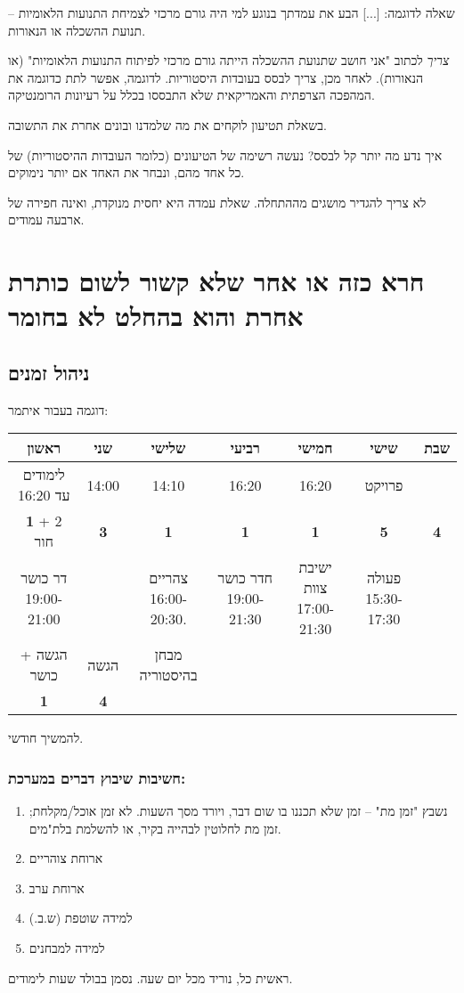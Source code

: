 \documentclass[a4paper]{book}
\begin{document}
	שאלה לדוגמה: [...] הבע את עמדתך בנוגע למי היה גורם מרכזי לצמיחת התנועות הלאומיות – תנועת ההשכלה או הנאורות. 
	
	\textit{צריך} לכתוב "אני חושב שתנועת ההשכלה הייתה גורם מרכזי לפיתוח התנועות הלאומיות" (או הנאורות). לאחר מכן, צריך לבסס בעובדות היסטוריות. לדוגמה, אפשר לתת כדוגמה את המהפכה הצרפתית והאמריקאית שלא התבססו בכלל על רעיונות הרומנטיקה. 
	
	בשאלת תטיעון לוקחים את מה שלמדנו ובונים אחרת את התשובה. 
	
	איך נדע מה יותר קל לבסס? נעשה רשימה של הטיעונים (כלומר העובדות ההיסטוריות) של כל אחד מהם, ונבחר את האחד אם יותר נימוקים. 
	
	לא צריך להגדיר מושגים מההתחלה. שאלת עמדה היא יחסית מנוקדת, ואינה חפירה של ארבעה עמודים. 
	
	\section{חרא כזה או אחר שלא קשור לשום כותרת אחרת והוא בהחלט לא בחומר}
	
	\subsection{ניהול זמנים}
	
	דוגמה בעבור איתמר: 
	\begin{center}
		\begin{tabular}{|c|c|c|c|c|c|c|}
			\hline ראשון & שני & שלישי & רביעי & חמישי & שישי & שבת \\
			\hline לימודים עד 16:20 &14:00&14:10&16:20&16:20&פרויקט&\\
			\textbf{1} + 2 חור& \textbf{3} & \textbf{1} & \textbf{1} &\textbf{1}&\textbf{5}&\textbf{4}\\
			דר כושר 19:00-21:00 && צהריים 16:00-20:30. & חדר כושר 19:00-21:30& ישיבת צוות 17:00-21:30 & פעולה 15:30-17:30  & \\
			\hline
			הגשה + כושר & הגשה & מבחן בהיסטוריה &&&&\\
			\textbf{1} & \textbf{4} &&&&&\\\hline
		\end{tabular}
	\end{center}
	להמשיך חודשי. 
	\subsubsection{חשיבות שיבוץ דברים במערכת: }
	\begin{multicols}{2}
		\begin{enumerate}
			\item נשבץ "זמן מת" – זמן שלא תכננו בו שום דבר, ויורד מסך השעות. לא זמן אוכל/מקלחת; זמן מת לחלוטין לבהייה בקיר, או להשלמת בלת"מים. 
			\item ארוחת צוהריים
			\item ארוחת ערב
			\item למידה שוטפת (ש.ב.)
			\item למידה למבחנים
		\end{enumerate}
	\end{multicols}
	ראשית כל, נוריד מכל יום שעה. 
	נסמן בבולד שעות לימודים. 
	
\end{document}

